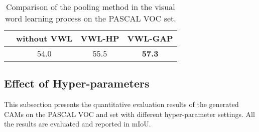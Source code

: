 \begin{table}[h]

  \caption{Comparison of the pooling method in the visual word learning process on the PASCAL VOC  set.}
  \label{tab_vwl_pooling}
  \centering
  \begin{tabular}{c|ccc}
    \toprule
            & without VWL & VWL-HP & VWL-GAP       \\ \midrule
     & 54.0        & 55.5   & \textbf{57.3} \\ \bottomrule
  \end{tabular}
\end{table}

\subsection{Effect of Hyper-parameters}
\label{hyper_params}

\par This subsection presents the quantitative evaluation results of the generated CAMs on the PASCAL VOC  and  set with different hyper-parameter settings. All the results are evaluated and reported in mIoU.


